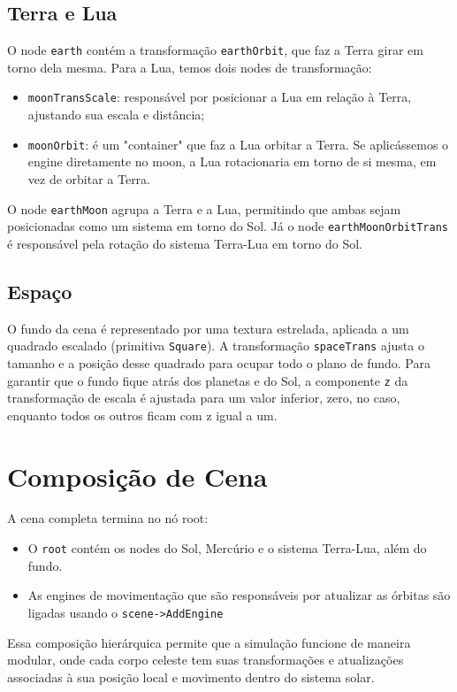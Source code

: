 \documentclass[11pt, a4paper]{article}
\begin{document}
\subsection{Terra e Lua}
O node \texttt{earth} contém a transformação \texttt{earthOrbit}, que faz a 
Terra girar em torno dela mesma. Para a Lua, temos dois nodes de transformação:

\begin{itemize}
\item \texttt{moonTransScale}: responsável por posicionar a Lua em relação à Terra, 
ajustando sua escala e distância;
\item \texttt{moonOrbit}: é um "container" que faz a Lua orbitar a Terra. Se
aplicássemos o engine diretamente no moon, a Lua rotacionaria em 
torno de si mesma, em vez de orbitar a Terra.
\end{itemize}

O node \texttt{earthMoon} agrupa a Terra e a Lua, permitindo que ambas sejam 
posicionadas como um sistema em torno do Sol. Já o node 
\texttt{earthMoonOrbitTrans} é responsável pela rotação do sistema Terra-Lua em 
torno do Sol.

\subsection{Espaço}
O fundo da cena é representado por uma textura estrelada, aplicada a um quadrado 
escalado (primitiva \texttt{Square}). A transformação \texttt{spaceTrans} ajusta 
o tamanho e a posição desse quadrado para ocupar todo o plano de fundo. Para 
garantir que o fundo fique atrás dos planetas e do Sol, a componente \texttt{z} 
da transformação de escala é ajustada para um valor inferior, zero, no caso,
enquanto todos os outros ficam com z igual a um.

\section {Composição de Cena}

A cena completa termina no nó root:

\begin{itemize}
\item O \texttt{root} contém os nodes do Sol, Mercúrio e o sistema Terra-Lua, além 
do fundo.
\item As engines de movimentação que são responsáveis por atualizar as órbitas 
são ligadas usando o \texttt{scene->AddEngine}
\end{itemize}

Essa composição hierárquica permite que a simulação funcione de maneira modular, 
onde cada corpo celeste tem suas transformações e atualizações associadas à sua 
posição local e movimento dentro do sistema solar.
\end{document}
